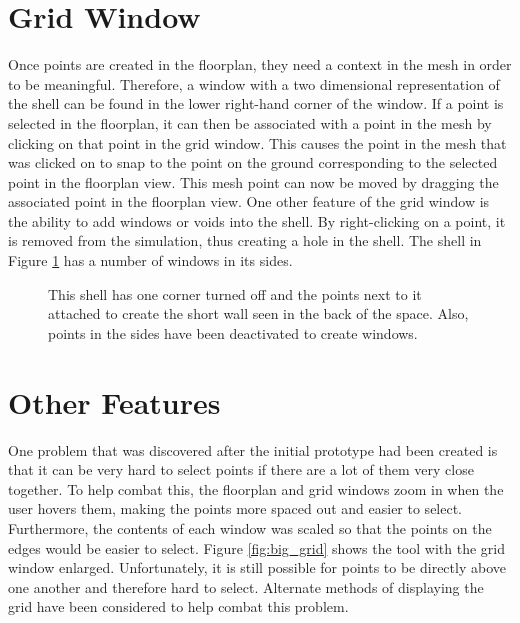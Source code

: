 \documentclass{thesis}
\begin{document}
\section{Grid Window}
Once points are created in the floorplan, they need a context in the mesh in order to be meaningful.  Therefore, a window with
a two dimensional representation of the shell can be found in the lower right-hand corner of the window.  If a point is selected
in the floorplan, it can then be associated with a point in the mesh by clicking on that point in the grid window.  This causes
the point in the mesh that was clicked on to snap to the point on the ground corresponding to the selected point in the
floorplan view.  This mesh point can now be moved by dragging the associated point in the floorplan view.  One other
feature of the grid window is the ability to add windows or voids into the shell.  By right-clicking on a point, it is
removed from the simulation, thus creating a hole in the shell.  The shell in Figure \ref{fig:bird_windows} has a number
of windows in its sides.

\begin{figure}
\caption[Shell with windows]{This shell has one corner turned off and the points next to it attached to create the short wall
seen in the back of the space.  Also, points in the sides have been deactivated to create windows.}
\label{fig:bird_windows}
\end{figure}

\section{Other Features}
One problem that was discovered after the initial prototype had been created is that it can be very hard to select points if
there are a lot of them very close together.  To help combat this, the floorplan and grid windows zoom in when the user hovers
them, making the points more spaced out and easier to select.  Furthermore, the contents of each window was scaled so that the
points on the edges would be easier to select.  Figure \ref{fig:big_grid} shows the tool with the grid window enlarged.
Unfortunately, it is still possible for points to be directly above one another and therefore hard to select.  Alternate methods
of displaying the grid have been considered to help combat this problem.
\end{document}
